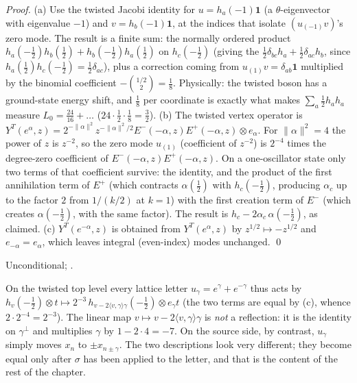 \noindent\emph{Proof.} (a) Use the twisted Jacobi identity for $u=h_a(-1)\mathbf 1$ (a $\theta$-eigenvector
with eigenvalue $-1$) and $v=h_b(-1)\mathbf 1$, at the indices that isolate $(u_{(-1)}v)$'s zero mode. The
result is a finite sum: the normally ordered product $h_a(-\tfrac12)h_b(\tfrac12)+h_b(-\tfrac12)h_a(\tfrac12)$ on
$h_c(-\tfrac12)$ (giving the $\tfrac12\delta_{bc}h_a+\tfrac12\delta_{ac}h_b$, since $h_a(\tfrac12)h_c(-\tfrac12)=\tfrac12\delta_{ac}$),
plus a correction coming from $u_{(1)}v=\delta_{ab}\mathbf 1$ multiplied by the binomial coefficient
$-\binom{1/2}{2}=\tfrac18$. Physically: the twisted boson has a ground-state energy shift, and $\tfrac18$ per
coordinate is exactly what makes $\sum_a\tfrac12 h_a h_a$ measure $L_0=\tfrac{24}{16}+\dots$ ($24\cdot\tfrac12\cdot\tfrac18=\tfrac32$).
(b) The twisted vertex operator is $Y^T(e^\alpha,z)=2^{-\|\alpha\|^2}z^{-\|\alpha\|^2/2}E^-(-\alpha,z)E^+(-\alpha,z)\otimes
e_\alpha$. For $\|\alpha\|^2=4$ the power of $z$ is $z^{-2}$, so the zero mode $u_{(1)}$ (coefficient of
$z^{-2}$) is $2^{-4}$ times the degree-zero coefficient of $E^-(-\alpha,z)E^+(-\alpha,z)$. On a
one-oscillator state only two terms of that coefficient survive: the identity, and the product of the
first annihilation term of $E^+$ (which contracts $\alpha(\tfrac12)$ with $h_c(-\tfrac12)$, producing
$\alpha_c$ up to the factor $2$ from $1/(k/2)$ at $k=1$) with the first creation term of $E^-$ (which
creates $\alpha(-\tfrac12)$, with the same factor). The result is $h_c-2\alpha_c\,\alpha(-\tfrac12)$, as claimed.
(c) $Y^T(e^{-\alpha},z)$ is obtained from $Y^T(e^\alpha,z)$
by $z^{1/2}\mapsto-z^{1/2}$ and $e_{-\alpha}=e_\alpha$, which leaves integral (even-index) modes unchanged.
\qed
\begin{status}
Unconditional; .
\end{status}

\begin{remark}
On the twisted top level every lattice letter $u_\gamma=e^\gamma+e^{-\gamma}$ thus acts by
$h_v(-\tfrac12)\otimes t\mapsto 2^{-3}\,h_{v-2\langle v,\gamma\rangle\gamma}(-\tfrac12)\otimes e_\gamma t$ (the two terms
are equal by (c), whence $2\cdot2^{-4}=2^{-3}$). The linear map $v\mapsto v-2\langle v,\gamma\rangle\gamma$ is
\emph{not} a reflection: it is the identity on $\gamma^\perp$ and multiplies $\gamma$ by $1-2\cdot4=-7$. On the
source side, by contrast, $u_\gamma$ simply moves $x_n$ to $\pm x_{n\pm\gamma}$. The two descriptions look
very different; they become equal only after $\sigma$ has been applied to the letter, and that is
the content of the rest of the chapter.
\end{remark}

